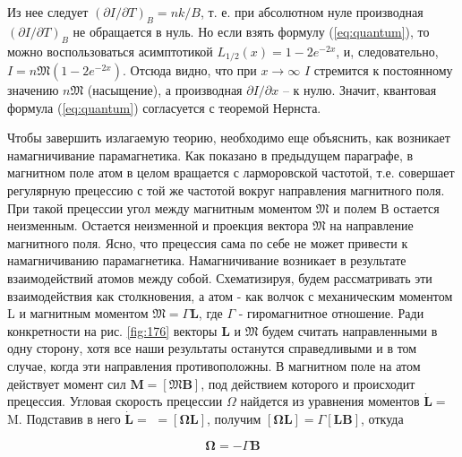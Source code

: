 \documentclass[12pt]{article}
\begin{document}
  Из нее следует $(\partial I / \partial T)_B=n k / B$, т. е. при абсолютном нуле производная $(\partial I / \partial T)_B$ не обращается в нуль. Но если взять формулу (\ref{eq:quantum}), то можно воспользоваться асимптотикой $L_{1 / 2}(x)=1-2 e^{-2 x}$, и, следовательно, $I=n \mathfrak{M}\left(1-2 e^{-2 x}\right)$. Отсюда видно, что при $x \rightarrow \infty$ $I$ стремится к постоянному значению $n\mathfrak{M}$ (насыщение), а производная $\partial I / \partial x$ -- к нулю. Значит, квантовая формула (\ref{eq:quantum}) согласуется с теоремой Нернста.

  Чтобы завершить излагаемую теорию, необходимо еще объяснить, как возникает намагничивание парамагнетика. Как показано в предыдущем параграфе, в магнитном поле атом в целом вращается с ларморовской частотой, т.е. совершает регулярную прецессию с той же частотой вокруг направления магнитного поля. При такой прецессии угол между магнитным моментом $\mathfrak{M}$ и полем В остается неизменным. Остается неизменной и проекция вектора $\mathfrak{M}$ на направление магнитного поля. Ясно, что прецессия сама по себе не может привести к намагничиванию парамагнетика. Намагничивание возникает в результате взаимодействий атомов между собой. Схематизируя, будем рассматривать эти взаимодействия как столкновения, а атом - как волчок с механическим моментом L и магнитным моментом $\mathfrak{M}=\Gamma \mathbf{L}$, где $\Gamma$ - гиромагнитное отношение. Ради конкретности на рис. \ref{fig:176} векторы $\mathbf{L}$ и $\mathfrak{M}$ будем считать направленными в одну сторону, хотя все наши результаты останутся справедливыми и в том случае, когда эти направления противоположны. В магнитном поле на атом действует момент сил $\mathbf{M}=[\mathfrak{M} \mathbf{B}]$, под действием которого и происходит прецессия. Угловая скорость прецессии $\Omega$ найдется из уравнения моментов $\dot{\mathbf{L}}=$ M. Подставив в него $\dot{\mathbf{L}}=$ $=[\boldsymbol{\Omega L}]$, получим $[\boldsymbol{\Omega L}]=\Gamma[\mathbf{L B}]$, откуда

  \begin{equation}
    \boldsymbol{\Omega} = -\Gamma\mathbf{B}
  \end{equation}
\end{document}
